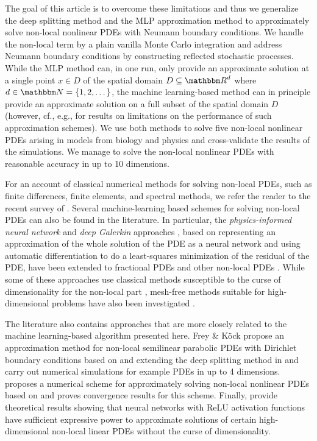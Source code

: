 The goal of this article is to overcome these limitations and thus we generalize the deep splitting method and the MLP approximation method to approximately solve non-local nonlinear PDEs with Neumann boundary conditions. We handle the non-local term by a plain vanilla Monte Carlo integration and address Neumann boundary conditions by constructing reflected stochastic processes. While the MLP method can, in one run, only provide an approximate solution at a single point $x \in D$ of the spatial domain $D\subseteq\R^d$ where $d\in\N=\{1,2,\dots\}$, the machine learning-based method can in principle provide an approximate solution on a full subset of the spatial domain $D$ (however, cf., e.g., \citep{heinrich1998monte,heinrich1999monte,grohs2021proof} for results on limitations on the performance of such approximation schemes).
%
We use both methods to solve five non-local nonlinear PDEs arising in models from biology and physics and cross-validate the results of the simulations.
%
We manage to solve the non-local nonlinear PDEs with reasonable accuracy in up to 10 dimensions.

For an account of classical numerical methods for solving non-local PDEs, such as finite differences, finite elements, and spectral methods, we refer the reader to the recent survey of \cite{delia2020numerical}. Several machine-learning based schemes for solving non-local PDEs can also be found in the literature. 
%
In particular, the \emph{physics-informed neural network} and \emph{deep Galerkin} approaches \citep{raissi2019physics,Sirignano2018dgm}, based on representing an approximation of the whole solution of the PDE as a neural network and using automatic differentiation to do a least-squares minimization of the residual of the PDE, have been extended to fractional PDEs and other non-local PDEs \citep{pang2019fpinns,lu2021deepxde,guo2022monte,alaradi2019extensions,yuan2022apinn}. While some of these approaches use classical methods susceptible to the curse of dimensionality for the non-local part \citep{pang2019fpinns,lu2021deepxde}, mesh-free methods suitable for high-dimensional problems have also been investigated \citep{guo2022monte,alaradi2019extensions,yuan2022apinn}. 

The literature also contains approaches that are more closely related to the machine learning-based algorithm presented here. Frey \& K\"ock \citep{frey2021deep,frey2022deep} propose an approximation method for non-local semilinear parabolic PDEs with Dirichlet boundary conditions based on and extending the deep splitting method in \citep{Beck2019} and carry out numerical simulations for example PDEs in up to 4 dimensions. \cite{castro2021deep} proposes a numerical scheme for approximately solving non-local nonlinear PDEs based on \cite{hure2020deep} and proves convergence results for this scheme.
%
Finally, \cite{gonon2021deep} provide theoretical results showing that neural networks with ReLU activation functions have sufficient expressive power to approximate solutions of certain high-dimensional non-local linear PDEs without the curse of dimensionality.

